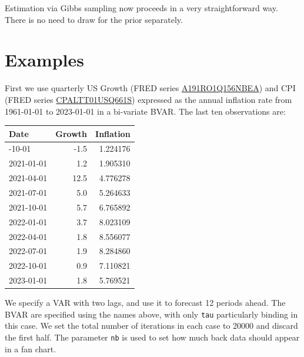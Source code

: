 \documentclass[
  letterpaper,
]{book}
\begin{document}
Estimation via Gibbs sampling now proceeds in a very straightforward
way. There is no need to draw for the prior separately.

\hypertarget{examples-1}{%
\section{Examples}\label{examples-1}}

First we use quarterly US Growth (FRED series
\href{https://fred.stlouisfed.org/series/A191RO1Q156NBEA}{A191RO1Q156NBEA})
and CPI (FRED series
\href{https://fred.stlouisfed.org/series/CPALTT01USQ661S}{CPALTT01USQ661S})
expressed as the annual inflation rate from 1961-01-01 to 2023-01-01 in
a bi-variate BVAR. The last ten observations are:

\begin{longtable}[]{@{}lrr@{}}
\toprule\noalign{}
Date & Growth & Inflation \\
\midrule\noalign{}
\endhead
\bottomrule\noalign{}
\endlastfoot
2020-10-01 & -1.5 & 1.224176 \\
2021-01-01 & 1.2 & 1.905310 \\
2021-04-01 & 12.5 & 4.776278 \\
2021-07-01 & 5.0 & 5.264633 \\
2021-10-01 & 5.7 & 6.765892 \\
2022-01-01 & 3.7 & 8.023109 \\
2022-04-01 & 1.8 & 8.556077 \\
2022-07-01 & 1.9 & 8.284860 \\
2022-10-01 & 0.9 & 7.110821 \\
2023-01-01 & 1.8 & 5.769521 \\
\end{longtable}

We specify a VAR with two lags, and use it to forecast 12 periods ahead.
The BVAR are specified using the names above, with only \texttt{tau}
particularly binding in this case. We set the total number of iterations
in each case to 20000 and discard the first half. The parameter
\texttt{nb} is used to set how much back data should appear in a fan
chart.
\end{document}
